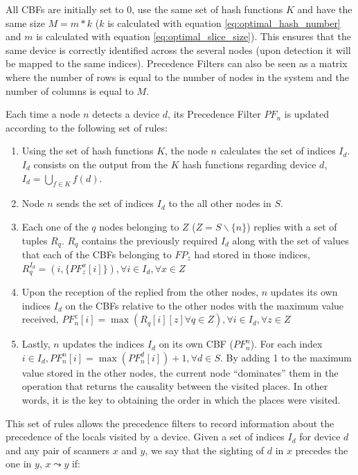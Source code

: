 All CBFs are initially set to 0, use the same set of hash functions
$K$ and have the same size $M = m * k$ ($k$ is calculated with
equation \ref{eq:optimal_hash_number} and $m$ is calculated with
equation \ref{eq:optimal_slice_size}). This ensures that the same
device is correctly identified across the several nodes (upon
detection it will be mapped to the same indices). Precedence Filters
can also be seen as a matrix where the number of rows is equal to the
number of nodes in the system and the number of columns is equal to $M$.

Each time a node $n$ detects a device $d$, its Precedence Filter
$PF_n$ is updated according to the following set of rules:
\begin{enumerate}
\item Using the set of hash functions $K$, the node $n$ calculates the
  set of indices $I_d$. $I_d$ consists on the output from the $K$ hash
  functions regarding device $d$, $I_d=\bigcup_{f \in K} f(d)$.
\item Node $n$ sends the set of indices $I_d$ to the all other nodes
  in $S$.
\item Each one of the $q$ nodes belonging to $Z$ ($Z = S \backslash
  \{n\}$) replies with a set of tuples $R_q$. $R_q$ contains
  the previously required $I_d$ along with the set of values that each
  of the CBFs belonging to $FP_z$ had stored in those indices,
  $R_q^{I_d}= (i,\{PF_z^x[i]\}) ,\forall i \in I_d, \forall x \in Z$
\item Upon the reception of the replied from the other nodes, $n$
  updates its own indices $I_d$ on the CBFs relative to the other
  nodes with the maximum value received, $PF_n^z[i] = \max(R_q[i][z] \forall
  q \in Z), \forall i \in I_d, \forall z \in Z$
\item Lastly, $n$ updates the indices $I_d$ on its own CBF
  ($PF_n^n$). For each index $i \in I_d, PF_n^n[i] = \max(PF_n^d[i])+1,
  \forall d \in S$. By adding 1 to the maximum value stored in the
  other nodes, the current node ``dominates'' them in the operation
  that returns the causality between the visited places. In other
  words, it is the key to obtaining the order in which the places were
  visited.
\end{enumerate}

This set of rules allows the precedence filters to record information
about the precedence of the locals visited by a device. Given a set of
indices $I_d$ for device $d$ and any pair of scanners $x$ and $y$, we
say that the sighting of $d$ in $x$ precedes the one in $y$, $x
\leadsto y$ if:

